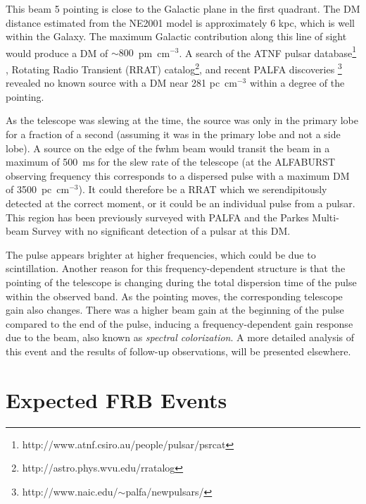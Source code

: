 \documentclass[a4paper,fleqn,usenatbib]{mnras}
\begin{document}
This beam 5 pointing is close to the Galactic plane in the first quadrant. The
DM distance estimated from the NE2001 model \citep{2002astro.ph..7156C} is
approximately 6 kpc, which is well within the Galaxy. The maximum Galactic
contribution along this line of sight would produce a DM of
$\sim800$~pm~cm$^{-3}$.  A search of the ATNF pulsar
database\footnote{http://www.atnf.csiro.au/people/pulsar/psrcat}
\citep{2005AJ....129.1993M}, Rotating Radio Transient (RRAT)
catalog\footnote{http://astro.phys.wvu.edu/rratalog}, and recent PALFA
discoveries \footnote{http://www.naic.edu/$\sim$palfa/newpulsars/} revealed no
known source with a DM near 281 pc~cm$^{-3}$ within a degree of the pointing.

As the telescope was slewing at the time, the source was only in the primary
lobe for a fraction of a second (assuming it was in the primary lobe and not a
side lobe). A source on the edge of the \gls{fwhm} beam would transit the beam
in a maximum of 500~ms for the slew rate of the telescope (at the ALFABURST
observing frequency this corresponds to a dispersed pulse with a maximum DM of
3500~pc~cm$^{-3}$).  It could therefore be a RRAT which we serendipitously
detected at the correct moment, or it could be an individual pulse from a
pulsar. This region has been previously surveyed with PALFA and the Parkes
Multi-beam Survey \citep{2001MNRAS.328...17M} with no significant detection of a
pulsar at this DM.

The pulse appears brighter at higher frequencies, which could be due to
scintillation. Another reason for this frequency-dependent structure is that the
pointing of the telescope is changing during the total dispersion time of the
pulse within the observed band. As the pointing moves, the corresponding
telescope gain also changes.  There was a higher beam gain at the beginning of
the pulse compared to the end of the pulse, inducing a frequency-dependent gain
response due to the beam, also known as \emph{spectral colorization}.  A more
detailed analysis of this event and the results of follow-up observations, will
be presented elsewhere.



\section{Expected FRB Events}
\label{sec:event_rates}
\end{document}
